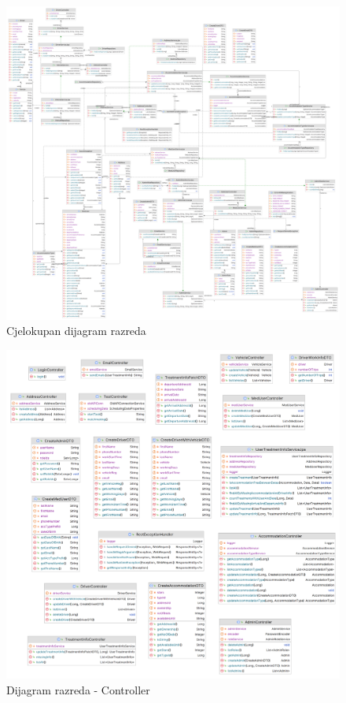 			\begin{figure}[H]
				\includegraphics[width=\textwidth]{slike/CjelokupanDijagramRazreda.PNG}
				\caption{Cjelokupan dijagram razreda}
				\label{classDiagram}
			\end{figure}
			
			\begin{figure}[H]
				\includegraphics[width=\textwidth]{slike/rest.PNG}
				\caption{Dijagram razreda - Controller}
				\label{restDiagram}
			\end{figure}
			
